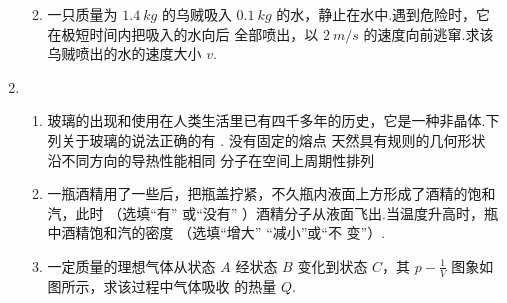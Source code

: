 \begin{enumerate}
\begin{enumerate}





\item 
一只质量为 $ 1.4 \ kg $ 的乌贼吸入 $ 0.1 \ kg $ 的水，静止在水中.遇到危险时，它在极短时间内把吸入的水向后
全部喷出，以 $ 2 \ m/s $ 的速度向前逃窜.求该乌贼喷出的水的速度大小 $ v $.






\end{enumerate}









\newpage


\item 
\begin{enumerate}
\item
玻璃的出现和使用在人类生活里已有四千多年的历史，它是一种非晶体.下列关于玻璃的说法正确的有 \underlinegap .
\fourchoices
{没有固定的熔点}
{天然具有规则的几何形状}
{沿不同方向的导热性能相同}
{分子在空间上周期性排列}






\item 
一瓶酒精用了一些后，把瓶盖拧紧，不久瓶内液面上方形成了酒精的饱和汽，此时 \underlinegap （选填“有”
或“没有”
）酒精分子从液面飞出.当温度升高时，瓶中酒精饱和汽的密度 \underlinegap （选填“增大”
“减小”或“不
变”）.






\item 
一定质量的理想气体从状态 $ A $ 经状态 $ B $ 变化到状态 $ C $，其 $ p-\frac{1}{V} $
图象如图所示，求该过程中气体吸收
的热量 $ Q $.
\begin{figure}[h!]
\flushright

\end{figure}






\end{enumerate}





\end{enumerate}
